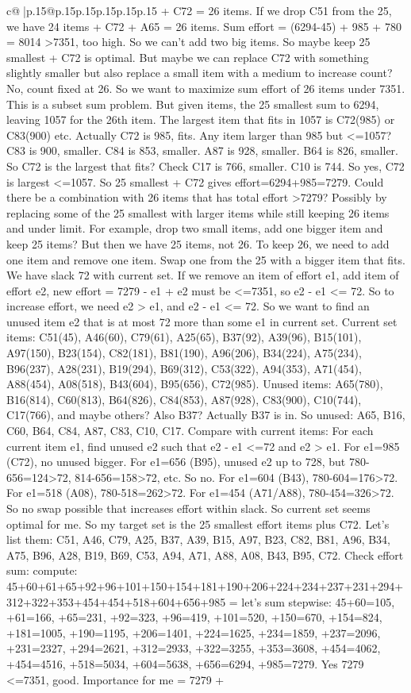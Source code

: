 \documentclass{article}
\begin{document}
{\begin{supertabular}{c@{$\;$}|p{.15\linewidth}@{}p{.15\linewidth}p{.15\linewidth}p{.15\linewidth}p{.15\linewidth}p{.15\linewidth}}
{{{+ C72 = 26 items. If we drop C51 from the 25, we have 24 items + C72 + A65 = 26 items. Sum effort = (6294{-}45) + 985 + 780 = 8014 >7351, too high. So we can’t add two big items. So maybe keep 25 smallest + C72 is optimal. But maybe we can replace C72 with something slightly smaller but also replace a small item with a medium to increase count? No, count fixed at 26. So we want to maximize sum effort of 26 items under 7351. This is a subset sum problem. But given items, the 25 smallest sum to 6294, leaving 1057 for the 26th item. The largest item that fits in 1057 is C72(985) or C83(900) etc. Actually C72 is 985, fits. Any item larger than 985 but <=1057? C83 is 900, smaller. C84 is 853, smaller. A87 is 928, smaller. B64 is 826, smaller. So C72 is the largest that fits? Check C17 is 766, smaller. C10 is 744. So yes, C72 is largest <=1057. So 25 smallest + C72 gives effort=6294+985=7279. Could there be a combination with 26 items that has total effort >7279? Possibly by replacing some of the 25 smallest with larger items while still keeping 26 items and under limit. For example, drop two small items, add one bigger item and keep 25 items? But then we have 25 items, not 26. To keep 26, we need to add one item and remove one item. Swap one from the 25 with a bigger item that fits. We have slack 72 with current set. If we remove an item of effort e1, add item of effort e2, new effort = 7279 {-} e1 + e2 must be <=7351, so e2 {-} e1 <= 72. So to increase effort, we need e2 > e1, and e2 {-} e1 <= 72. So we want to find an unused item e2 that is at most 72 more than some e1 in current set. Current set items: C51(45), A46(60), C79(61), A25(65), B37(92), A39(96), B15(101), A97(150), B23(154), C82(181), B81(190), A96(206), B34(224), A75(234), B96(237), A28(231), B19(294), B69(312), C53(322), A94(353), A71(454), A88(454), A08(518), B43(604), B95(656), C72(985). Unused items: A65(780), B16(814), C60(813), B64(826), C84(853), A87(928), C83(900), C10(744), C17(766), and maybe others? Also B37? Actually B37 is in. So unused: A65, B16, C60, B64, C84, A87, C83, C10, C17. Compare with current items: For each current item e1, find unused e2 such that e2 {-} e1 <=72 and e2 > e1. For e1=985 (C72), no unused bigger. For e1=656 (B95), unused e2 up to 728, but 780{-}656=124>72, 814{-}656=158>72, etc. So no. For e1=604 (B43), 780{-}604=176>72. For e1=518 (A08), 780{-}518=262>72. For e1=454 (A71/A88), 780{-}454=326>72. So no swap possible that increases effort within slack. So current set seems optimal for me. So my target set is the 25 smallest effort items plus C72. Let’s list them: C51, A46, C79, A25, B37, A39, B15, A97, B23, C82, B81, A96, B34, A75, B96, A28, B19, B69, C53, A94, A71, A88, A08, B43, B95, C72. Check effort sum: compute: 45+60+61+65+92+96+101+150+154+181+190+206+224+234+237+231+294+312+322+353+454+454+518+604+656+985 = let’s sum stepwise: 45+60=105, +61=166, +65=231, +92=323, +96=419, +101=520, +150=670, +154=824, +181=1005, +190=1195, +206=1401, +224=1625, +234=1859, +237=2096, +231=2327, +294=2621, +312=2933, +322=3255, +353=3608, +454=4062, +454=4516, +518=5034, +604=5638, +656=6294, +985=7279. Yes 7279 <=7351, good. Importance for me = 7279 + }}}
\end{supertabular}}
\end{document}
